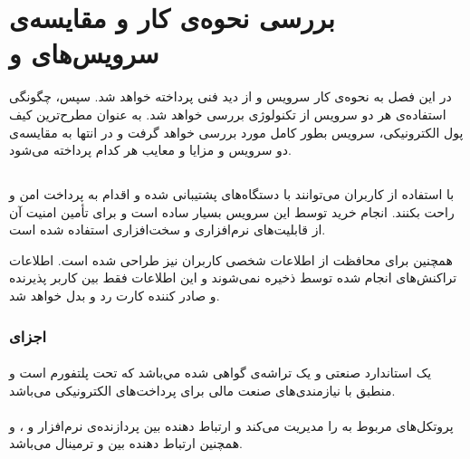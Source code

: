 \documentclass[oneside]{report}
\begin{document}
		\chapter{بررسی نحوه‌ی کار و مقایسه‌ی  سرویس‌های   {\Large{} }  و   {\Large{} }}\label{comparison}
		در این فصل به نحوه‌ی کار سرویس 
							{\normalsize {}} 
		و 
							{\normalsize {}}
	از دید فنی پرداخته خواهد شد. سپس،  چگونگی استفاده‌ی هر دو سرویس از تکنولوژی 
						{\normalsize {}} 
	بررسی خواهد شد. به عنوان مطرح‌ترین کیف پول الکترونیکی،   سرویس 
						{\normalsize {}}
 بطور کامل مورد بررسی خواهد گرفت و در انتها به مقایسه‌ی دو سرویس و مزایا و معایب هر کدام پرداخته می‌شود.
 
 \section{{\large{}} }
	 با استفاده از
	 						{\normalsize {}}
کاربران می‌توانند با  دستگاه‌های 
{\normalsize {}}
	پشتیبانی شده و 
	{\normalsize {}}
	اقدام به پرداخت امن و راحت بکنند. 
انجام خرید توسط این سرویس بسیار ساده است و برای تأمین امنیت آن از قابلیت‌های نرم‌افزاری و سخت‌افزاری استفاده شده است.

{\normalsize {}}
همچنین برای محافظت از اطلاعات شخصی کاربران نیز طراحی شده است. اطلاعات تراکنش‌های انجام شده توسط 
{\normalsize {}}
ذخیره نمی‌شوند و این اطلاعات فقط بین کاربر پذیرنده و صادر کننده کارت رد‌‌ و بدل خواهد شد.

\subsection{اجزای {\normalsize {}} }
 
 \subsubsection{{\small {}}}
 {\normalsize {}}
 یک استاندارد صنعتی و یک تراشه‌ی گواهی شده
 مي‌باشد که تحت پلتفورم 
 {\normalsize {}}
 است و منطبق با نیازمندی‌های صنعت مالی برای پرداخت‌های الکترونیکی می‌باشد.
 
  \subsubsection{{\small {}}}
  {\normalsize {}}
  پروتکل‌های مربوط به 
   {\normalsize {}}
   را مدیریت می‌کند و ارتباط دهنده بین پردازنده‌ی نرم‌افزار 
  و 
   {\normalsize {}}،   و همچنین ارتباط دهنده بین 
    {\normalsize {}}
    و ترمینال
     {\normalsize {}} 
      می‌باشد.
      
\end{document}
